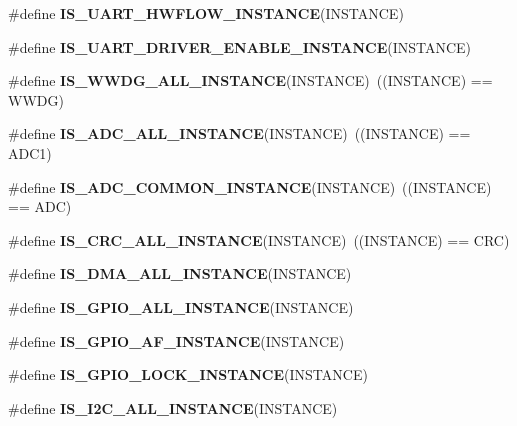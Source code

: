 \begin{DoxyCompactItemize}
\item 
\#define {\bfseries I\+S\+\_\+\+U\+A\+R\+T\+\_\+\+H\+W\+F\+L\+O\+W\+\_\+\+I\+N\+S\+T\+A\+N\+CE}(I\+N\+S\+T\+A\+N\+CE)
\item 
\#define {\bfseries I\+S\+\_\+\+U\+A\+R\+T\+\_\+\+D\+R\+I\+V\+E\+R\+\_\+\+E\+N\+A\+B\+L\+E\+\_\+\+I\+N\+S\+T\+A\+N\+CE}(I\+N\+S\+T\+A\+N\+CE)
\item 
\mbox{\label{group___exported__macro_gac2a8aaec233e19987232455643a04d6f}} 
\#define {\bfseries I\+S\+\_\+\+W\+W\+D\+G\+\_\+\+A\+L\+L\+\_\+\+I\+N\+S\+T\+A\+N\+CE}(I\+N\+S\+T\+A\+N\+CE)~((I\+N\+S\+T\+A\+N\+CE) == W\+W\+DG)
\item 
\mbox{\label{group___exported__macro_ga2204b62b378bcf08b3b9006c184c7c23}} 
\#define {\bfseries I\+S\+\_\+\+A\+D\+C\+\_\+\+A\+L\+L\+\_\+\+I\+N\+S\+T\+A\+N\+CE}(I\+N\+S\+T\+A\+N\+CE)~((I\+N\+S\+T\+A\+N\+CE) == A\+D\+C1)
\item 
\mbox{\label{group___exported__macro_gad8a5831c786b6b265531b890a194cbe2}} 
\#define {\bfseries I\+S\+\_\+\+A\+D\+C\+\_\+\+C\+O\+M\+M\+O\+N\+\_\+\+I\+N\+S\+T\+A\+N\+CE}(I\+N\+S\+T\+A\+N\+CE)~((I\+N\+S\+T\+A\+N\+CE) == A\+DC)
\item 
\mbox{\label{group___exported__macro_gaa514941a7f02f65eb27450c05e4e8dd1}} 
\#define {\bfseries I\+S\+\_\+\+C\+R\+C\+\_\+\+A\+L\+L\+\_\+\+I\+N\+S\+T\+A\+N\+CE}(I\+N\+S\+T\+A\+N\+CE)~((I\+N\+S\+T\+A\+N\+CE) == C\+RC)
\item 
\#define {\bfseries I\+S\+\_\+\+D\+M\+A\+\_\+\+A\+L\+L\+\_\+\+I\+N\+S\+T\+A\+N\+CE}(I\+N\+S\+T\+A\+N\+CE)
\item 
\#define {\bfseries I\+S\+\_\+\+G\+P\+I\+O\+\_\+\+A\+L\+L\+\_\+\+I\+N\+S\+T\+A\+N\+CE}(I\+N\+S\+T\+A\+N\+CE)
\item 
\#define {\bfseries I\+S\+\_\+\+G\+P\+I\+O\+\_\+\+A\+F\+\_\+\+I\+N\+S\+T\+A\+N\+CE}(I\+N\+S\+T\+A\+N\+CE)
\item 
\#define {\bfseries I\+S\+\_\+\+G\+P\+I\+O\+\_\+\+L\+O\+C\+K\+\_\+\+I\+N\+S\+T\+A\+N\+CE}(I\+N\+S\+T\+A\+N\+CE)
\item 
\#define {\bfseries I\+S\+\_\+\+I2\+C\+\_\+\+A\+L\+L\+\_\+\+I\+N\+S\+T\+A\+N\+CE}(I\+N\+S\+T\+A\+N\+CE)
\item 
\mbox{\label{group___exported__macro_gad9ec4c52f0572ee67d043e006f1d5e39}} 

\end{DoxyCompactItemize}
